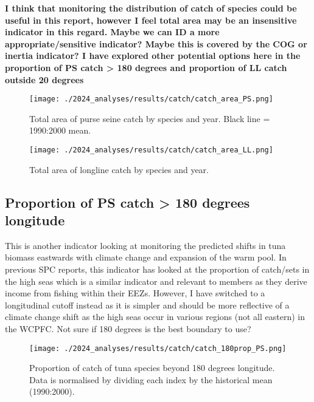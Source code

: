 \documentclass[
]{article}
\begin{document}
\textbf{I think that monitoring the distribution of catch of species
could be useful in this report, however I feel total area may be an
insensitive indicator in this regard. Maybe we can ID a more
appropriate/sensitive indicator? Maybe this is covered by the COG or
inertia indicator? I have explored other potential options here in the
proportion of PS catch \textgreater{} 180 degrees and proportion of LL
catch outside 20 degrees}

\begin{figure}
\centering
\texttt{[image: ./2024\_analyses/results/catch/catch\_area\_PS.png]}
\caption{Total area of purse seine catch by species and year. Black line
= 1990:2000 mean.}
\end{figure}

\clearpage

\begin{figure}
\centering
\texttt{[image: ./2024\_analyses/results/catch/catch\_area\_LL.png]}
\caption{Total area of longline catch by species and year.}
\end{figure}

\clearpage

\hypertarget{proportion-of-ps-catch-180-degrees-longitude}{%
\subsection{Proportion of PS catch \textgreater{} 180 degrees
longitude}\label{proportion-of-ps-catch-180-degrees-longitude}}

This is another indicator looking at monitoring the predicted shifts in
tuna biomass eastwards with climate change and expansion of the warm
pool. In previous SPC reports, this indicator has looked at the
proportion of catch/sets in the high seas which is a similar indicator
and relevant to members as they derive income from fishing within their
EEZs. However, I have switched to a longitudinal cutoff instead as it is
simpler and should be more reflective of a climate change shift as the
high seas occur in various regions (not all eastern) in the WCPFC. Not
sure if 180 degrees is the best boundary to use?

\begin{figure}
\centering
\texttt{[image: ./2024\_analyses/results/catch/catch\_180prop\_PS.png]}
\caption{Proportion of catch of tuna species beyond 180 degrees
longitude. Data is normalised by dividing each index by the historical
mean (1990:2000).}
\end{figure}
\end{document}
